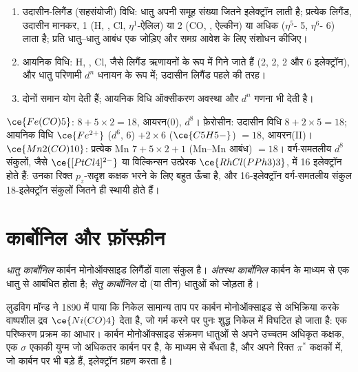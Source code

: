 \begin{method}[इलेक्ट्रॉन गणना, दो ढंगों से]\label{met:b3:organometallic-bonding:count}
\begin{enumerate}
  \item उदासीन-लिगैंड (सहसंयोजी) विधि: धातु अपनी समूह संख्या जितने
        इलेक्ट्रॉन लाती है; प्रत्येक लिगैंड, उदासीन मानकर, 1 (H, , Cl,
        $\eta^1$-ऐलिल) या 2 (CO, , ऐल्कीन) या अधिक ($\eta^5$- 5, $\eta^6$- 6) लाता है; प्रति
        धातु--धातु आबंध एक जोड़िए और समग्र आवेश के लिए संशोधन कीजिए।
  \item आयनिक विधि: H, , Cl,  जैसे लिगैंड ऋणायनों के रूप में गिने जाते हैं (2, 2,
        2 और 6 इलेक्ट्रॉन), और धातु परिणामी $d^n$ धनायन के रूप में; उदासीन लिगैंड
        पहले की तरह।
  \item दोनों समान योग देती हैं; आयनिक विधि ऑक्सीकरण अवस्था
        और $d^n$ गणना भी देती है।
\end{enumerate}
\end{method}

\begin{example}[गणना]\label{ex:b3:organometallic-bonding:count}
$\ce{Fe(CO)5}$: $8 + 5 \times 2 = 18$, आयरन(0), $d^8$। फ़ेरोसीन: उदासीन विधि $8 + 2 \times 5 = 18$; आयनिक विधि
$\ce{Fe^{2+}}$ ($d^6$, 6) $+ 2 \times 6$ ($\ce{C5H5-}$) $= 18$, आयरन(II)। $\ce{Mn2(CO)10}$: प्रत्येक Mn $7 + 5 \times 2 + 1$ (Mn--Mn
आबंध) $= 18$। वर्ग-समतलीय $d^8$ संकुलों, जैसे $\ce{[PtCl4]^{2-}}$ या विल्किन्सन उत्प्रेरक
$\ce{RhCl(PPh3)3}$, में 16 इलेक्ट्रॉन होते हैं: उनका रिक्त $p_z$-सदृश कक्षक भरने के लिए बहुत ऊँचा है, और
16-इलेक्ट्रॉन वर्ग-समतलीय संकुल 18-इलेक्ट्रॉन संकुलों जितने ही स्थायी होते हैं।
\end{example}

\section{कार्बोनिल और फ़ॉस्फ़ीन}

\begin{definition}[धातु कार्बोनिल]\label{def:b3:organometallic-bonding:carbonyl}
\emph{धातु कार्बोनिल} कार्बन मोनोऑक्साइड
लिगैंडों वाला संकुल है। \emph{अंतस्थ कार्बोनिल} कार्बन के माध्यम से
एक धातु से आबंधित होता है; \emph{सेतु कार्बोनिल}
दो (या तीन) धातुओं को जोड़ता है।
\end{definition}

लुडविग मॉन्ड ने 1890 में पाया कि निकेल सामान्य ताप पर कार्बन मोनोऑक्साइड से
अभिक्रिया करके वाष्पशील द्रव $\ce{Ni(CO)4}$ देता है, जो गर्म करने पर पुनः शुद्ध
निकेल में विघटित हो जाता है: एक परिष्करण प्रक्रम का आधार। कार्बन मोनोऑक्साइड
संक्रमण धातुओं से अपने उच्चतम अधिकृत कक्षक, एक $\sigma$ एकाकी युग्म जो अधिकतर
कार्बन पर है, के माध्यम से बँधता है, और अपने रिक्त $\pi^*$ कक्षकों में, जो कार्बन पर भी
बड़े हैं, इलेक्ट्रॉन ग्रहण करता है।

